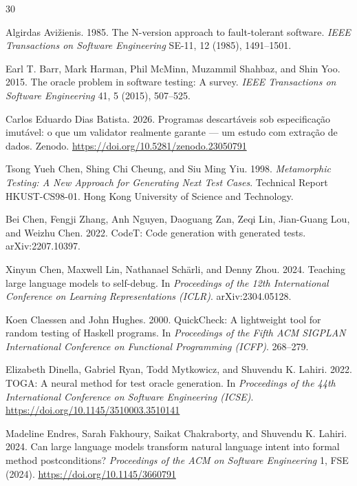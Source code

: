 \documentclass[sigconf,nonacm]{acmart}
\begin{document}

\begin{thebibliography}{30}

Algirdas Avižienis. 1985.
The N-version approach to fault-tolerant software.
\textit{IEEE Transactions on Software Engineering} SE-11, 12 (1985), 1491--1501.

Earl T. Barr, Mark Harman, Phil McMinn, Muzammil Shahbaz, and Shin Yoo. 2015.
The oracle problem in software testing: A survey.
\textit{IEEE Transactions on Software Engineering} 41, 5 (2015), 507--525.

Carlos Eduardo Dias Batista. 2026.
Programas descartáveis sob especificação imutável: o que um validator realmente garante --- um estudo com extração de dados.
Zenodo. \url{https://doi.org/10.5281/zenodo.23050791}

Tsong Yueh Chen, Shing Chi Cheung, and Siu Ming Yiu. 1998.
\textit{Metamorphic Testing: A New Approach for Generating Next Test Cases}.
Technical Report HKUST-CS98-01. Hong Kong University of Science and Technology.

Bei Chen, Fengji Zhang, Anh Nguyen, Daoguang Zan, Zeqi Lin, Jian-Guang Lou, and Weizhu Chen. 2022.
CodeT: Code generation with generated tests.
arXiv:2207.10397.

Xinyun Chen, Maxwell Lin, Nathanael Schärli, and Denny Zhou. 2024.
Teaching large language models to self-debug.
In \textit{Proceedings of the 12th International Conference on Learning Representations (ICLR)}. arXiv:2304.05128.

Koen Claessen and John Hughes. 2000.
QuickCheck: A lightweight tool for random testing of Haskell programs.
In \textit{Proceedings of the Fifth ACM SIGPLAN International Conference on Functional Programming (ICFP)}. 268--279.

Elizabeth Dinella, Gabriel Ryan, Todd Mytkowicz, and Shuvendu K. Lahiri. 2022.
TOGA: A neural method for test oracle generation.
In \textit{Proceedings of the 44th International Conference on Software Engineering (ICSE)}. \url{https://doi.org/10.1145/3510003.3510141}

Madeline Endres, Sarah Fakhoury, Saikat Chakraborty, and Shuvendu K. Lahiri. 2024.
Can large language models transform natural language intent into formal method postconditions?
\textit{Proceedings of the ACM on Software Engineering} 1, FSE (2024). \url{https://doi.org/10.1145/3660791}


\end{thebibliography}
\end{document}
